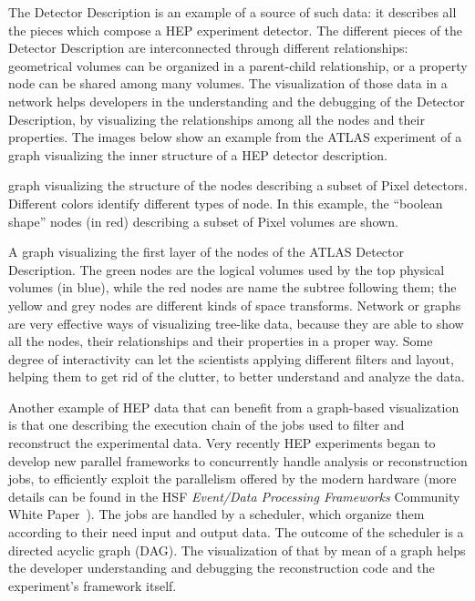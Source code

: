 \documentclass[12pt,a4paper]{article}
\begin{document}
The Detector Description is an example of a source of such data: it describes all the pieces which compose a HEP experiment detector.
The different pieces of the Detector Description are interconnected through different relationships: geometrical volumes can be organized
in a parent-child relationship, or a property node can be shared among many volumes. The visualization of those data in a network helps
developers in the understanding and the debugging of the Detector Description, by visualizing the relationships among all the nodes and
their properties. The images below show an example from the ATLAS experiment \cite{ATLASGeoModel2017} of a graph visualizing the inner structure of a HEP detector description.



graph visualizing the structure of the nodes describing a subset of Pixel detectors. Different colors identify different types of node. In this example, the “boolean shape” nodes (in red) describing a subset of Pixel volumes are shown.



A graph visualizing the first layer of the nodes of the ATLAS Detector Description. The green nodes are the logical volumes used by the top physical volumes (in blue), while the red nodes are name the subtree following them; the yellow and grey nodes are different kinds of space transforms. Network or graphs are very effective ways of visualizing tree-like data, because they are able to show all the 	nodes, their relationships and their properties in a proper way. Some degree of interactivity can let the scientists applying different filters and layout, helping them to get rid of the clutter, to better understand and analyze the data.


Another example of HEP data that can benefit from a graph-based visualization is that one describing the execution chain of the jobs
used to filter and reconstruct the experimental data. Very recently HEP experiments began to develop new parallel frameworks
to concurrently handle analysis or reconstruction jobs, to efficiently exploit the parallelism offered by the modern hardware (more details can be found in the HSF \textit{Event/Data Processing Frameworks} Community White Paper~\cite{HSF-CWP-2017-08}).
The jobs are handled by a scheduler, which organize them according to their need input and output data. The outcome of the scheduler
is a directed acyclic graph (DAG). The visualization of that by mean of a graph helps the developer understanding and debugging the
reconstruction code and the experiment’s framework itself.
\end{document}
